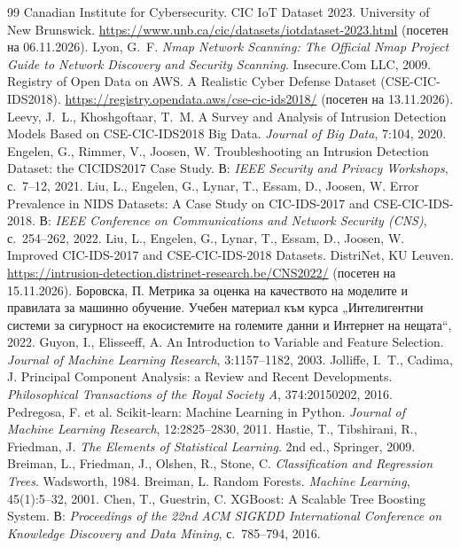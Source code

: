 \begin{thebibliography}{99}
 Canadian Institute for Cybersecurity. CIC IoT Dataset 2023. University of New Brunswick. \url{https://www.unb.ca/cic/datasets/iotdataset-2023.html} (посетен на 06.11.2026).
 Lyon, G.~F. \emph{Nmap Network Scanning: The Official Nmap Project Guide to Network Discovery and Security Scanning}. Insecure.Com LLC, 2009.
 Registry of Open Data on AWS. A Realistic Cyber Defense Dataset (CSE-CIC-IDS2018). \url{https://registry.opendata.aws/cse-cic-ids2018/} (посетен на 13.11.2026).
 Leevy, J.~L., Khoshgoftaar, T.~M. A Survey and Analysis of Intrusion Detection Models Based on CSE-CIC-IDS2018 Big Data. \emph{Journal of Big Data}, 7:104, 2020.
 Engelen, G., Rimmer, V., Joosen, W. Troubleshooting an Intrusion Detection Dataset: the CICIDS2017 Case Study. В: \emph{IEEE Security and Privacy Workshops}, с.~7--12, 2021.
 Liu, L., Engelen, G., Lynar, T., Essam, D., Joosen, W. Error Prevalence in NIDS Datasets: A Case Study on CIC-IDS-2017 and CSE-CIC-IDS-2018. В: \emph{IEEE Conference on Communications and Network Security (CNS)}, с.~254--262, 2022.
 Liu, L., Engelen, G., Lynar, T., Essam, D., Joosen, W. Improved CIC-IDS-2017 and CSE-CIC-IDS-2018 Datasets. DistriNet, KU Leuven. \url{https://intrusion-detection.distrinet-research.be/CNS2022/} (посетен на 15.11.2026).
 Боровска, П. Метрика за оценка на качеството на моделите и правилата за машинно обучение. Учебен материал към курса „Интелигентни системи за сигурност на екосистемите на големите данни и Интернет на нещата“, 2022.
 Guyon, I., Elisseeff, A. An Introduction to Variable and Feature Selection. \emph{Journal of Machine Learning Research}, 3:1157--1182, 2003.
 Jolliffe, I.~T., Cadima, J. Principal Component Analysis: a Review and Recent Developments. \emph{Philosophical Transactions of the Royal Society A}, 374:20150202, 2016.
 Pedregosa, F. et al. Scikit-learn: Machine Learning in Python. \emph{Journal of Machine Learning Research}, 12:2825--2830, 2011.
 Hastie, T., Tibshirani, R., Friedman, J. \emph{The Elements of Statistical Learning}. 2nd ed., Springer, 2009.
 Breiman, L., Friedman, J., Olshen, R., Stone, C. \emph{Classification and Regression Trees}. Wadsworth, 1984.
 Breiman, L. Random Forests. \emph{Machine Learning}, 45(1):5--32, 2001.
 Chen, T., Guestrin, C. XGBoost: A Scalable Tree Boosting System. В: \emph{Proceedings of the 22nd ACM SIGKDD International Conference on Knowledge Discovery and Data Mining}, с.~785--794, 2016.

\end{thebibliography}
